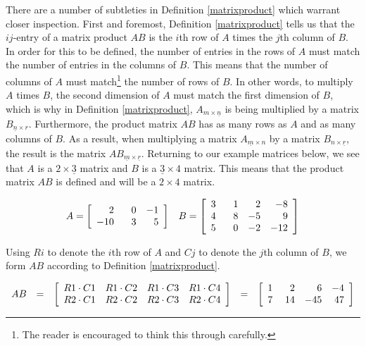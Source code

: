 There are a number of subtleties in Definition \ref{matrixproduct} which warrant closer inspection. First and foremost, Definition \ref{matrixproduct} tells us that the $ij$-entry of a matrix product $AB$ is the $i$th row of $A$ times the $j$th column of $B$.  In order for this to be defined, the number of entries in the rows of $A$ must match the number of entries in the columns of $B$. This means that the number of columns of $A$ must match\footnote{The reader is encouraged to think this through carefully.} the number of rows of $B$.  In other words, to multiply $A$ times $B$, the second dimension of $A$ must match the first dimension of $B$, which is why in Definition \ref{matrixproduct}, $A_{m \times \underline{n}}$ is being multiplied by a matrix $B_{\underline{n} \times r}$.  Furthermore, the product matrix $AB$ has as many rows as $A$ and as many columns of $B$. As a result, when multiplying a matrix $A_{\underline{m} \times n}$ by a matrix $B_{n \times \underline{r}}$, the result is the matrix  $AB_{\underline{m} \times \underline{r}}$. Returning to our example matrices below, we see that $A$ is a $2 \times \underline{3}$ matrix and $B$ is a $\underline{3} \times 4$ matrix.  This means that the product matrix $AB$ is defined and will be a $2 \times 4$ matrix.

\[ \begin{array}{cc}

A = \left[\begin{array}{rrr} 2 & \hphantom{-}0 & -1 \\ -10 & 3 & 5 \\ \end{array} \right]

&

B = \left[\begin{array}{rrrr} 3 & \hphantom{-}1 & 2 & -8 \\ 4 & 8 & -5 & 9  \\ 5 & 0 & -2 & -12 \\  \end{array} \right]

\end{array}\]


Using $Ri$ to denote the $i$th row of $A$ and $Cj$ to denote the $j$th column of $B$, we form $AB$ according to Definition \ref{matrixproduct}.

\[ \begin{array}{rclcl}

AB & = & \left[\begin{array}{rrrr} R1 \cdot C1 &   R1 \cdot C2 & R1 \cdot C3 & R1 \cdot C4 \\ R2 \cdot C1 &   R2 \cdot C2 & R2 \cdot C3 & R2 \cdot C4 \\  \end{array} \right] & = & \left[\begin{array}{rrrr} 1 &  \hphantom{-}2 & 6 & -4 \\ 7 &  14 & -45 & 47 \\  \end{array} \right] \\ \end{array} \]

